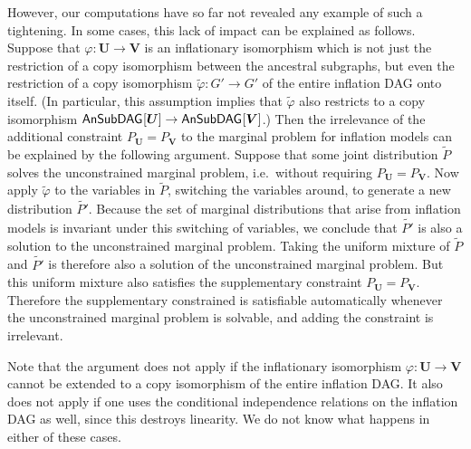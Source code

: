 However, our computations have so far not revealed any example of such a tightening. In some cases, this lack of impact can be explained as follows.
Suppose that $\varphi:\bm{U}\to\bm{V}$ is an inflationary isomorphism which is not just the restriction of a copy isomorphism between the ancestral subgraphs, but even the restriction of a copy isomorphism $\tilde{\varphi}:G'\to G'$ of the entire inflation DAG onto itself. (In particular, this assumption implies that $\tilde{\varphi}$ also restricts to a copy isomorphism ${\operatorname{\mathsf{AnSubDAG}}_{}}\lbrack\bm{U}\rbrack\to{\operatorname{\mathsf{AnSubDAG}}_{}}\lbrack\bm{V}\rbrack$.) Then the irrelevance of the additional constraint $P_{\bm{U}} = P_{\bm{V}}$ to the marginal problem for inflation models can be explained by the following argument. Suppose that some joint distribution $\tilde{P}$ solves the unconstrained marginal problem, i.e.~without requiring $P_{\bm{U}} = P_{\bm{V}}$. Now apply $\tilde{\varphi}$ to the variables in $\tilde{P}$, switching the variables around, to generate a new distribution $\tilde{P'}$. Because the set of marginal distributions that arise from inflation models is invariant under this switching of variables, we conclude that $\tilde{P'}$ is also a solution to the unconstrained marginal problem. Taking the uniform mixture of $\tilde{P}$ and $\tilde{P'}$ is therefore also a solution of the unconstrained marginal problem. But this uniform mixture also satisfies the supplementary constraint $P_{\bm{U}} = P_{\bm{V}}$. Therefore the supplementary constrained is satisfiable automatically whenever the unconstrained marginal problem is solvable, and adding the constraint is irrelevant.

Note that the argument does not apply if the inflationary isomorphism $\varphi:\bm{U}\to\bm{V}$ cannot be extended to a copy isomorphism of the entire inflation DAG. It also does not apply if one uses the conditional independence relations on the inflation DAG as well, since this destroys linearity. We do not know what happens in either of these cases.




